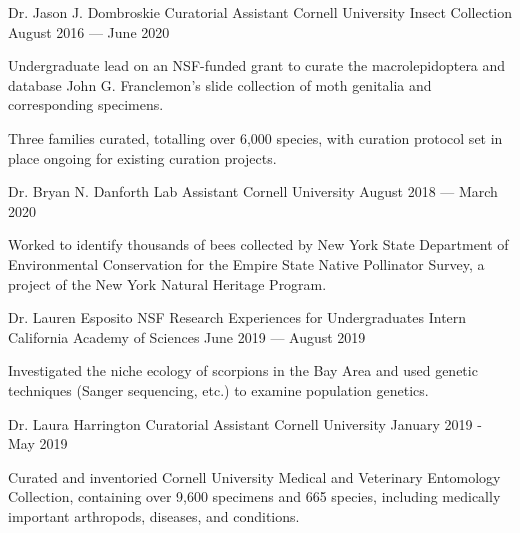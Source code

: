 \begin{cventries}
  \cventry
    {Dr. Jason J. Dombroskie} %
    {Curatorial Assistant} %
    {Cornell University Insect Collection} %
    {August 2016 — June 2020} %
    {
      \begin{cvitems} %
        \item {Undergraduate lead on an NSF-funded grant to curate the macrolepidoptera and database John G. Franclemon's slide collection of moth genitalia and corresponding specimens.}
        \item {Three families curated, totalling over 6,000 species, with curation protocol set in place ongoing for existing curation projects.}
      \end{cvitems}
    }

  \cventry
    {Dr. Bryan N. Danforth} %
    {Lab Assistant} %
    {Cornell University} %
    {August 2018 — March 2020} %
    {
      \begin{cvitems} %
        \item {Worked to identify thousands of bees collected by New York State Department of Environmental Conservation for the Empire State Native Pollinator Survey, a project of the New York Natural Heritage Program.}
      \end{cvitems}
    }

  \cventry
    {Dr. Lauren Esposito} %
    {NSF Research Experiences for Undergraduates Intern} %
    {California Academy of Sciences} %
    {June 2019 — August 2019} %
    {
      \begin{cvitems} %
        \item {Investigated the niche ecology of scorpions in the Bay Area and used genetic techniques (Sanger sequencing, etc.) to examine population genetics.}
      \end{cvitems}
    }

  \cventry
    {Dr. Laura Harrington} %
    {Curatorial Assistant} %
    {Cornell University} %
    {January 2019 - May 2019} %
    {
      \begin{cvitems} %
        \item {Curated and inventoried Cornell University Medical and Veterinary Entomology Collection, containing over 9,600 specimens and 665 species, including medically important arthropods, diseases, and conditions.}
      \end{cvitems}
    }


\end{cventries}
